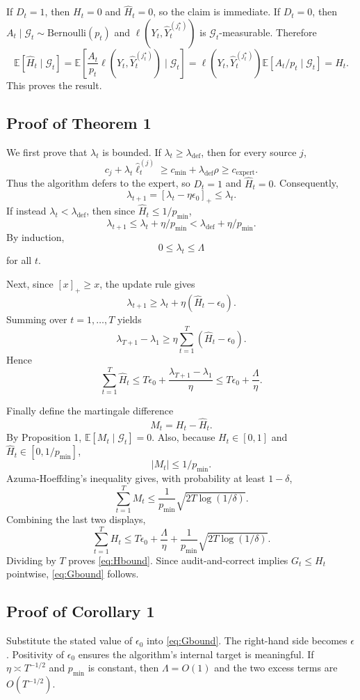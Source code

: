 \documentclass[11pt]{article}
\newcommand{\E}{\mathbb{E}}
\newcommand{\1}{\mathbf{1}}
\newcommand{\calG}{\mathcal{G}}
\newcommand{\Yhat}{\widehat Y}
\newcommand{\ellhat}{\widehat\ell}
\newcommand{\Hhat}{\widehat H}
\begin{document}
If $D_t=1$, then $H_t=0$ and $\Hhat_t=0$, so the claim is immediate. If $D_t=0$, then $A_t\mid\calG_t\sim\mathrm{Bernoulli}(p_t)$ and $\ell(Y_t,\Yhat_t^{(j_t^\star)})$ is $\calG_t$-measurable. Therefore
\[
\E[\Hhat_t\mid\calG_t]
=
\E\left[\frac{A_t}{p_t}\ell(Y_t,\Yhat_t^{(j_t^\star)})\mid\calG_t\right]
=
\ell(Y_t,\Yhat_t^{(j_t^\star)})\E[A_t/p_t\mid\calG_t]
=H_t.
\]
This proves the result.

\subsection{Proof of Theorem 1}

We first prove that $\lambda_t$ is bounded. If $\lambda_t\ge\lambda_{\mathrm{def}}$, then for every source $j$,
\[
c_j+\lambda_t\ellhat_t^{(j)}
\ge c_{\min}+\lambda_{\mathrm{def}}\rho
\ge c_{\mathrm{expert}}.
\]
Thus the algorithm defers to the expert, so $D_t=1$ and $\Hhat_t=0$. Consequently,
\[
\lambda_{t+1}=[\lambda_t-\eta\epsilon_0]_+\le \lambda_t.
\]
If instead $\lambda_t<\lambda_{\mathrm{def}}$, then since $\Hhat_t\le 1/p_{\min}$,
\[
\lambda_{t+1}
\le \lambda_t+\eta/p_{\min}
<\lambda_{\mathrm{def}}+\eta/p_{\min}.
\]
By induction,
\[
0\le \lambda_t\le \Lambda
\]
for all $t$.

Next, since $[x]_+\ge x$, the update rule gives
\[
\lambda_{t+1}
\ge \lambda_t+\eta(\Hhat_t-\epsilon_0).
\]
Summing over $t=1,\ldots,T$ yields
\[
\lambda_{T+1}-\lambda_1
\ge
\eta\sum_{t=1}^T(\Hhat_t-\epsilon_0).
\]
Hence
\[
\sum_{t=1}^T \Hhat_t
\le
T\epsilon_0+\frac{\lambda_{T+1}-\lambda_1}{\eta}
\le
T\epsilon_0+\frac{\Lambda}{\eta}.
\]

Finally define the martingale difference
\[
M_t=H_t-\Hhat_t.
\]
By Proposition 1, $\E[M_t\mid\calG_t]=0$. Also, because $H_t\in[0,1]$ and $\Hhat_t\in[0,1/p_{\min}]$,
\[
|M_t|\le 1/p_{\min}.
\]
Azuma-Hoeffding's inequality gives, with probability at least $1-\delta$,
\[
\sum_{t=1}^T M_t
\le
\frac{1}{p_{\min}}\sqrt{2T\log(1/\delta)}.
\]
Combining the last two displays,
\[
\sum_{t=1}^T H_t
\le
T\epsilon_0+\frac{\Lambda}{\eta}
+
\frac{1}{p_{\min}}\sqrt{2T\log(1/\delta)}.
\]
Dividing by $T$ proves \eqref{eq:Hbound}. Since audit-and-correct implies $G_t\le H_t$ pointwise, \eqref{eq:Gbound} follows.

\subsection{Proof of Corollary 1}

Substitute the stated value of $\epsilon_0$ into \eqref{eq:Gbound}. The right-hand side becomes $\epsilon$. Positivity of $\epsilon_0$ ensures the algorithm's internal target is meaningful. If $\eta\asymp T^{-1/2}$ and $p_{\min}$ is constant, then $\Lambda=O(1)$ and the two excess terms are $O(T^{-1/2})$.
\end{document}
